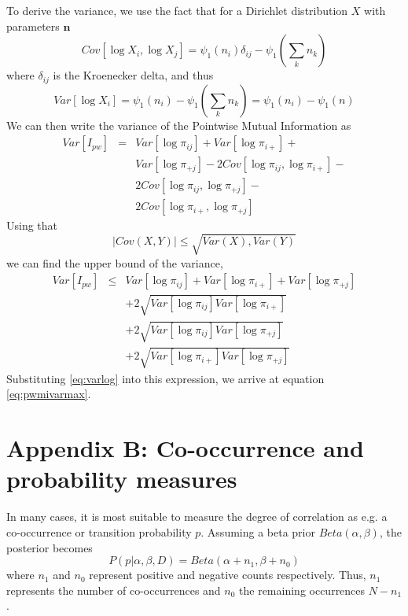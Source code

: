 \documentclass[conference]{IEEEtran}
\newcommand{\trigamma}{\psi_1}
\begin{document}
To derive the variance, we use the fact that for a Dirichlet distribution $X$ with parameters $\bm{n}$
\begin{equation}
Cov[\log X_i, \log X_j] = \trigamma(n_i) \delta_{ij} - \trigamma \left( \sum_k n_k \right)
\end{equation}
where $\delta_{ij}$ is the Kroenecker delta, and thus
\begin{equation}
\label{eq:varlog}
Var[\log X_i] = \trigamma(n_i) - \trigamma \left( \sum_k n_k \right) = \trigamma(n_i) - \trigamma(n)
\end{equation}
We can then write the variance of the Pointwise Mutual Information as
\begin{eqnarray}
Var[I_{pw}] & = & Var[\log \pi_{ij}] + Var[\log \pi_{i+}] +\nonumber \\
&& Var[\log \pi_{+j}] - 2Cov[\log \pi_{ij}, \log \pi_{i+}] - \nonumber \\
&& 2Cov[\log \pi_{ij}, \log \pi_{+j}] -  \nonumber \\
&& 2Cov[\log \pi_{i+}, \log \pi_{+j}] \nonumber
\end{eqnarray}
Using that
\begin{equation}
|Cov(X,Y)| \leq \sqrt{Var(X),Var(Y)}
\end{equation}
we can find the upper bound of the variance,
\begin{eqnarray}
Var[I_{pw}] & \leq & Var[\log \pi_{ij}] + Var[\log \pi_{i+}] + Var[\log \pi_{+j}]\nonumber \\
&& + 2\sqrt{Var[\log \pi_{ij}]Var[\log \pi_{i+}]} \nonumber \\
&& + 2\sqrt{Var[\log \pi_{ij}]Var[\log \pi_{+j}]} \nonumber \\
&& + 2\sqrt{Var[\log \pi_{i+}]Var[\log \pi_{+j}]}
\end{eqnarray}
Substituting \ref{eq:varlog} into this expression, we arrive at equation \ref{eq:pwmivarmax}.

\section*{Appendix B: Co-occurrence and probability measures}

In many cases, it is most suitable to measure the degree of correlation as e.g. a co-occurrence or transition probability $p$. Assuming a beta prior $Beta(\alpha,\beta)$, the posterior becomes
\begin{equation}
P(p|\alpha,\beta, D) = Beta(\alpha + n_1, \beta + n_0)
\end{equation}
where $n_1$ and $n_0$ represent positive and negative counts respectively. Thus, $n_1$ represents the number of co-occurrences and $n_0$ the remaining occurrences $N-n_1$.
\end{document}
